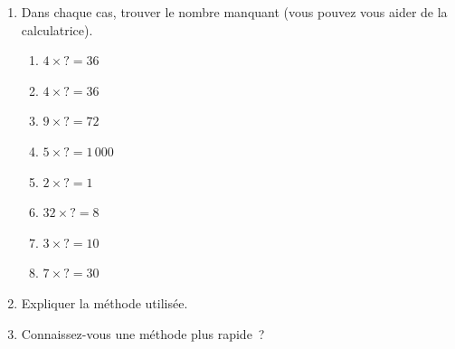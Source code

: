 \documentclass[activite]{thedocument}
\begin{document}
    \begin{enumerate}
        \item Dans chaque cas, trouver le nombre manquant (vous pouvez vous
        aider de la calculatrice).
        \begin{enumerate}
            \item $4\times?=36$\answerspace{1em}
            \item $4\times?=36$\answerspace{1em}
            \item $9\times?=72$\answerspace{1em}
            \item $5\times?=1\,000$\answerspace{1em}
            \item $2\times?=1$\answerspace{1em}
            \item $32\times?=8$\answerspace{1em}
            \item $3\times?=10$\answerspace{1em}
            \item $7\times?=30$\answerspace{1em}
        \end{enumerate}
        \item Expliquer la méthode utilisée.\answerspace{1.5cm}
        \item Connaissez-vous une méthode plus rapide~?\answerspace{1.5cm}
    \end{enumerate}
\end{document}
